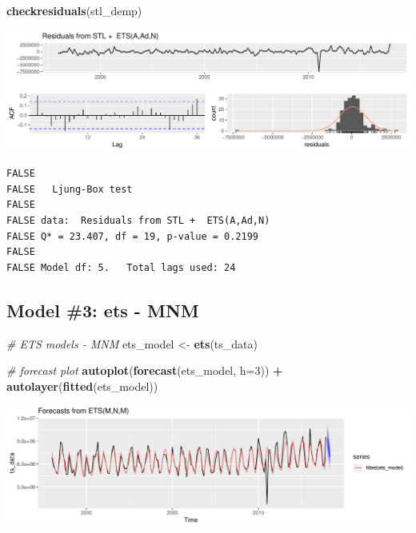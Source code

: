 \documentclass[openany]{book}
\newenvironment{Shaded}{\begin{snugshade}}{\end{snugshade}}
\newcommand{\CommentTok}[1]{\textcolor[rgb]{0.56,0.35,0.01}{\textit{#1}}}
\newcommand{\DataTypeTok}[1]{\textcolor[rgb]{0.13,0.29,0.53}{#1}}
\newcommand{\DecValTok}[1]{\textcolor[rgb]{0.00,0.00,0.81}{#1}}
\newcommand{\KeywordTok}[1]{\textcolor[rgb]{0.13,0.29,0.53}{\textbf{#1}}}
\newcommand{\NormalTok}[1]{#1}
\newcommand{\OperatorTok}[1]{\textcolor[rgb]{0.81,0.36,0.00}{\textbf{#1}}}
\newcommand{\StringTok}[1]{\textcolor[rgb]{0.31,0.60,0.02}{#1}}
\begin{document}
\begin{Shaded}
\begin{Highlighting}[]
\KeywordTok{checkresiduals}\NormalTok{(stl_demp)}
\end{Highlighting}
\end{Shaded}

\includegraphics{Part-B-AS_files/figure-latex/unnamed-chunk-6-2.pdf}

\begin{verbatim}
FALSE 
FALSE   Ljung-Box test
FALSE 
FALSE data:  Residuals from STL +  ETS(A,Ad,N)
FALSE Q* = 23.407, df = 19, p-value = 0.2199
FALSE 
FALSE Model df: 5.   Total lags used: 24
\end{verbatim}

\hypertarget{model-3-ets---mnm}{%
\subsection{Model \#3: ets - MNM}\label{model-3-ets---mnm}}

\begin{Shaded}
\begin{Highlighting}[]
\CommentTok{# ETS models - MNM}
\NormalTok{ets_model <-}\StringTok{ }\KeywordTok{ets}\NormalTok{(ts_data)}

\CommentTok{# forecast plot}
\KeywordTok{autoplot}\NormalTok{(}\KeywordTok{forecast}\NormalTok{(ets_model, }\DataTypeTok{h=}\DecValTok{3}\NormalTok{)) }\OperatorTok{+}\StringTok{ }\KeywordTok{autolayer}\NormalTok{(}\KeywordTok{fitted}\NormalTok{(ets_model))}
\end{Highlighting}
\end{Shaded}

\includegraphics{Part-B-AS_files/figure-latex/unnamed-chunk-7-1.pdf}
\end{document}
